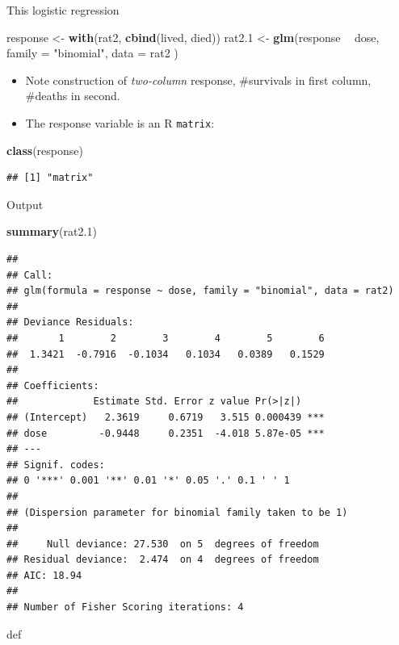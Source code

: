 \documentclass[ignorenonframetext,]{beamer}
\newenvironment{Shaded}{\begin{snugshade}}{\end{snugshade}}
\newcommand{\DataTypeTok}[1]{\textcolor[rgb]{0.13,0.29,0.53}{#1}}
\newcommand{\FloatTok}[1]{\textcolor[rgb]{0.00,0.00,0.81}{#1}}
\newcommand{\KeywordTok}[1]{\textcolor[rgb]{0.13,0.29,0.53}{\textbf{#1}}}
\newcommand{\NormalTok}[1]{#1}
\newcommand{\OperatorTok}[1]{\textcolor[rgb]{0.81,0.36,0.00}{\textbf{#1}}}
\newcommand{\StringTok}[1]{\textcolor[rgb]{0.31,0.60,0.02}{#1}}
\begin{document}
\begin{frame}[fragile]{This logistic regression}
\protect\hypertarget{this-logistic-regression}{}

\begin{Shaded}
\begin{Highlighting}[]
\NormalTok{response <-}\StringTok{ }\KeywordTok{with}\NormalTok{(rat2, }\KeywordTok{cbind}\NormalTok{(lived, died))}
\NormalTok{rat2}\FloatTok{.1}\NormalTok{ <-}\StringTok{ }\KeywordTok{glm}\NormalTok{(response }\OperatorTok{~}\StringTok{ }\NormalTok{dose,}
  \DataTypeTok{family =} \StringTok{"binomial"}\NormalTok{,}
  \DataTypeTok{data =}\NormalTok{ rat2}
\NormalTok{)}
\end{Highlighting}
\end{Shaded}

\begin{itemize}
\item
  Note construction of \emph{two-column} response, \#survivals in first
  column, \#deaths in second.
\item
  The response variable is an R \texttt{matrix}:
\end{itemize}

\begin{Shaded}
\begin{Highlighting}[]
\KeywordTok{class}\NormalTok{(response)}
\end{Highlighting}
\end{Shaded}

\begin{verbatim}
## [1] "matrix"
\end{verbatim}

\end{frame}

\begin{frame}[fragile]{Output}
\protect\hypertarget{output-3}{}

\begin{Shaded}
\begin{Highlighting}[]
\KeywordTok{summary}\NormalTok{(rat2}\FloatTok{.1}\NormalTok{)}
\end{Highlighting}
\end{Shaded}

\begin{verbatim}
## 
## Call:
## glm(formula = response ~ dose, family = "binomial", data = rat2)
## 
## Deviance Residuals: 
##       1        2        3        4        5        6  
##  1.3421  -0.7916  -0.1034   0.1034   0.0389   0.1529  
## 
## Coefficients:
##             Estimate Std. Error z value Pr(>|z|)    
## (Intercept)   2.3619     0.6719   3.515 0.000439 ***
## dose         -0.9448     0.2351  -4.018 5.87e-05 ***
## ---
## Signif. codes:  
## 0 '***' 0.001 '**' 0.01 '*' 0.05 '.' 0.1 ' ' 1
## 
## (Dispersion parameter for binomial family taken to be 1)
## 
##     Null deviance: 27.530  on 5  degrees of freedom
## Residual deviance:  2.474  on 4  degrees of freedom
## AIC: 18.94
## 
## Number of Fisher Scoring iterations: 4
\end{verbatim}

def

\end{frame}
\end{document}
